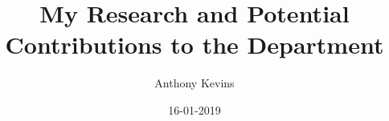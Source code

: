 \documentclass[14pt]{beamer}
\title{My Research and Potential Contributions to the Department}
\author{Anthony Kevins}
\institute{School of Governance\\
	Utrecht University}
\date{16-01-2019}
\begin{document}
\begin{frame}
\titlepage
\end{frame}





\end{document}
